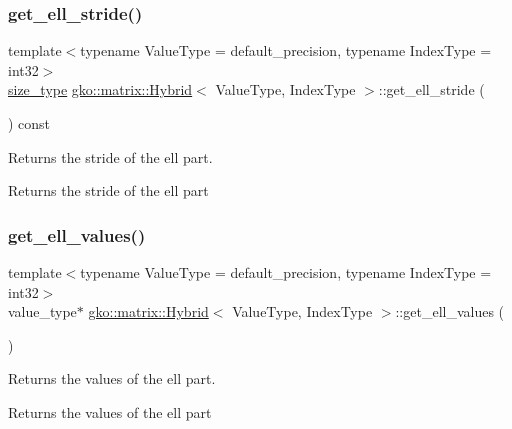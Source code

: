 \subsubsection{\texorpdfstring{get\+\_\+ell\+\_\+stride()}{get\_ell\_stride()}}
{\footnotesize\ttfamily template$<$typename Value\+Type = default\+\_\+precision, typename Index\+Type = int32$>$ \\
\hyperlink{namespacegko_a6e5c95df0ae4e47aab2f604a22d98ee7}{size\+\_\+type} \hyperlink{classgko_1_1matrix_1_1Hybrid}{gko\+::matrix\+::\+Hybrid}$<$ Value\+Type, Index\+Type $>$\+::get\+\_\+ell\+\_\+stride (\begin{DoxyParamCaption}{ }\end{DoxyParamCaption}) const\hspace{0.3cm}{\ttfamily [noexcept]}}



Returns the stride of the ell part. 

\begin{DoxyReturn}{Returns}
the stride of the ell part 
\end{DoxyReturn}
\mbox{\label{classgko_1_1matrix_1_1Hybrid_a9cd9c8b8dbf8b3c2c014f355faa61474}} 
\subsubsection{\texorpdfstring{get\+\_\+ell\+\_\+values()}{get\_ell\_values()}}
{\footnotesize\ttfamily template$<$typename Value\+Type = default\+\_\+precision, typename Index\+Type = int32$>$ \\
value\+\_\+type$\ast$ \hyperlink{classgko_1_1matrix_1_1Hybrid}{gko\+::matrix\+::\+Hybrid}$<$ Value\+Type, Index\+Type $>$\+::get\+\_\+ell\+\_\+values (\begin{DoxyParamCaption}{ }\end{DoxyParamCaption})\hspace{0.3cm}{\ttfamily [noexcept]}}



Returns the values of the ell part. 

\begin{DoxyReturn}{Returns}
the values of the ell part 
\end{DoxyReturn}
\mbox{\label{classgko_1_1matrix_1_1Hybrid_a00e86ba08ecfc46dbc9b74b800d10a8d}} 
